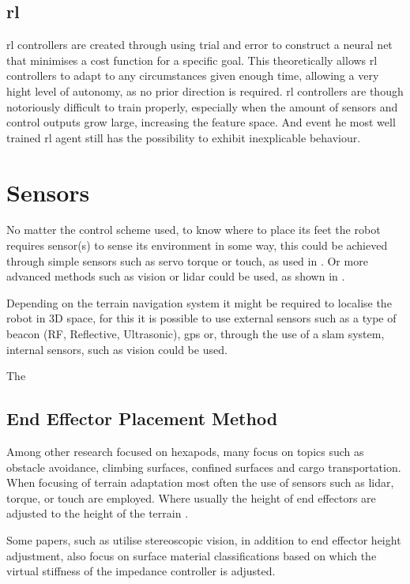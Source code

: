     \subsection{\acl{rl}}
    \ac{rl} controllers are created through using trial and error to construct a neural net that minimises a cost function for a specific goal. This theoretically allows \ac{rl} controllers to adapt to any
    circumstances given enough time, allowing a very hight level of autonomy, as no prior direction is required. \ac{rl} controllers are though notoriously difficult to train properly, especially when the 
    amount of sensors and control outputs grow large, increasing the feature space. And event he most well trained \ac{rl} agent still has the possibility to exhibit inexplicable behaviour.
    
\section{Sensors}
    No matter the control scheme used, to know where to place its feet the robot requires sensor(s) to sense its environment in some way, this could be achieved through simple sensors such as servo torque or touch,
    as used in \cite{t}. Or more advanced methods such as vision or \ac{lidar} could be used, as shown in \cite{t}.

    Depending on the terrain navigation system it might be required to localise the robot in 3D space, for this it is possible to use external sensors such as a type of beacon (RF, Reflective, Ultrasonic), \ac{gps}
    or, through the use of a \ac{slam} system, internal sensors, such as vision could be used.

    The 

    \subsection{End Effector Placement Method}

    Among other research focused on hexapods, many focus on topics such as obstacle avoidance, climbing surfaces, confined surfaces and cargo transportation.
    When focusing of terrain adaptation most often the use of sensors such as \ac{lidar}, torque, or touch are employed. Where usually the height of end effectors
    are adjusted to the height of the terrain \cite{coelho2021trends}.

    Some papers, such as \cite{homberger2017terrain} utilise stereoscopic vision, in addition to end effector height adjustment, also focus on surface material classifications based on which the virtual
    stiffness of the impedance controller is adjusted.

